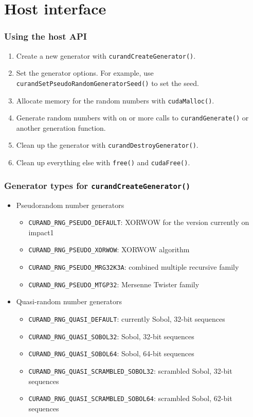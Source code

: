 \documentclass[handout]{beamer}
\numberwithin{equation}{section}
\begin{document}
\section{Host interface}

\begin{frame}
\frametitle{Using the host API}
\begin{enumerate}
\pause \item Create a new generator with {\tt curandCreateGenerator()}.
\pause \item Set the generator options. For example, use {\tt curandSetPseudoRandomGeneratorSeed()} to set the seed.
\pause \item Allocate memory for the random numbers with {\tt cudaMalloc()}.
\pause \item Generate random numbers with on or more calls to {\tt curandGenerate()} or another generation function.
\pause \item Clean up the generator with {\tt curandDestroyGenerator()}.
\pause \item Clean up everything else with {\tt free()} and {\tt cudaFree()}.
\end{enumerate}
\end{frame}

\begin{frame}
\frametitle{Generator types for {\tt curandCreateGenerator()}}
\begin{itemize}
\item Pseudorandom number generators
\begin{itemize}
\pause \item {\tt CURAND\_RNG\_PSEUDO\_DEFAULT}: XORWOW for the version currently on impact1
\pause \item {\tt CURAND\_RNG\_PSEUDO\_XORWOW}: XORWOW algorithm
\pause \item {\tt CURAND\_RNG\_PSEUDO\_MRG32K3A}: combined multiple recursive family
\pause \item {\tt CURAND\_RNG\_PSEUDO\_MTGP32}: Mersenne Twister family
\end{itemize}
\pause \item Quasi-random number generators
\begin{itemize}
\pause \item {\tt CURAND\_RNG\_QUASI\_DEFAULT}: currently Sobol, 32-bit sequences
\pause \item {\tt CURAND\_RNG\_QUASI\_SOBOL32}: Sobol, 32-bit sequences
 \item {\tt CURAND\_RNG\_QUASI\_SOBOL64}: Sobol, 64-bit sequences
\pause \item {\tt CURAND\_RNG\_QUASI\_SCRAMBLED\_SOBOL32}: scrambled Sobol, 32-bit sequences
 \item {\tt CURAND\_RNG\_QUASI\_SCRAMBLED\_SOBOL64}: scrambled Sobol, 62-bit sequences
\end{itemize}
\end{itemize}
\end{frame}
\end{document}
